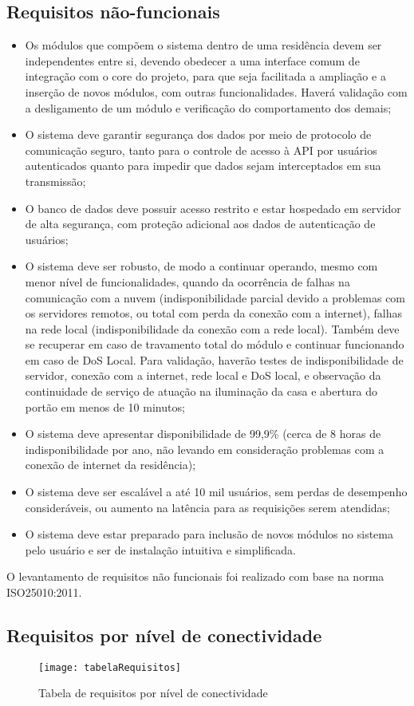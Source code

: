 \subsection{Requisitos não-funcionais}
\begin{itemize}
\item Os módulos que compõem o sistema dentro de uma residência devem ser independentes entre si, devendo obedecer a uma interface comum de integração com o core do projeto, para que seja facilitada a ampliação e a inserção de novos módulos, com outras funcionalidades. Haverá validação com a desligamento de um módulo e verificação do comportamento dos demais;
\item O sistema deve garantir segurança dos dados por meio de protocolo de comunicação seguro, tanto para o controle de acesso à API por usuários autenticados quanto para impedir que dados sejam interceptados em sua transmissão;
\item O banco de dados deve possuir acesso restrito e estar hospedado em servidor de alta segurança, com proteção adicional aos dados de autenticação de usuários;
\item O sistema deve ser robusto, de modo a continuar operando, mesmo com menor nível de funcionalidades, quando da ocorrência de falhas na comunicação com a nuvem (indisponibilidade parcial devido a problemas com os servidores remotos, ou total com perda da conexão com a internet), falhas na rede local (indisponibilidade da conexão com a rede local). Também deve se recuperar em caso de travamento total do módulo e continuar funcionando em caso de DoS Local. Para validação, haverão testes de indisponibilidade de servidor, conexão com a internet, rede local e DoS local, e observação da continuidade de serviço de atuação na iluminação da casa e abertura do portão em menos de 10 minutos;
\item O sistema deve apresentar disponibilidade de 99,9\% (cerca de 8 horas de indisponibilidade por ano, não levando em consideração problemas com a conexão de internet da residência);
\item O sistema deve ser escalável a até 10 mil usuários, sem perdas de desempenho consideráveis, ou aumento na latência para as requisições serem atendidas;
\item O sistema deve estar preparado para inclusão de novos módulos no sistema pelo usuário e   ser de instalação intuitiva e simplificada.
\end{itemize}

O levantamento de requisitos não funcionais foi realizado com base na norma ISO25010:2011.

\subsection{Requisitos por nível de conectividade}

\begin{figure}[H]
	\centering
	\caption{Tabela de requisitos por nível de conectividade}
  \texttt{[image: tabelaRequisitos]}
\label{fig:tabelaRequisitos}
\end{figure}
